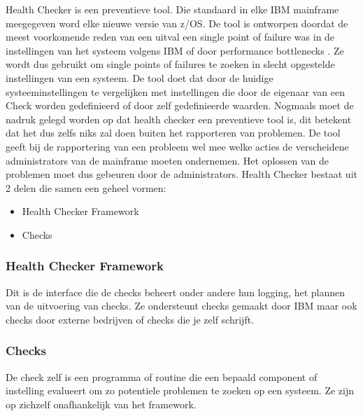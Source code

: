 Health Checker is een preventieve tool. Die standaard in elke IBM mainframe meegegeven word elke nieuwe versie van z/OS. De tool is ontworpen doordat de meest voorkomende reden van een uitval een single point of failure was in de instellingen van het systeem volgens IBM \cite{Bezzi2010} of door performance bottlenecks \cite{Walle2013}. Ze wordt dus gebruikt om single points of failures te zoeken in slecht opgestelde instellingen van een systeem. De tool doet dat door de huidige systeeminstellingen te vergelijken met instellingen die door de eigenaar van een Check worden gedefinieerd of door zelf gedefinieerde waarden. Nogmaals moet de nadruk gelegd worden op dat health checker een preventieve tool is, dit betekent dat het dus zelfs niks zal doen buiten het rapporteren van problemen. De tool geeft bij de rapportering van een probleem wel mee welke acties de verscheidene administrators van de mainframe moeten ondernemen. Het oplossen van de problemen moet dus gebeuren door de administrators. Health Checker bestaat uit 2 delen die samen een geheel vormen: 

\begin{itemize}
	\item Health Checker Framework 
	\item Checks 
\end{itemize}

\subsubsection{Health Checker Framework}
\label{subsubsec:Health Checker Framework}

Dit is de interface die de checks beheert onder andere hun logging, het plannen van de uitvoering van checks. Ze ondersteunt checks gemaakt door IBM maar ook checks door externe bedrijven of checks die je zelf schrijft. 

\subsubsection{Checks}
\label{subsubsec:Check}
De check zelf is een programma of routine die een bepaald component of instelling evalueert om zo potentiele problemen te zoeken op een systeem. Ze zijn op zichzelf onafhankelijk van het framework. 